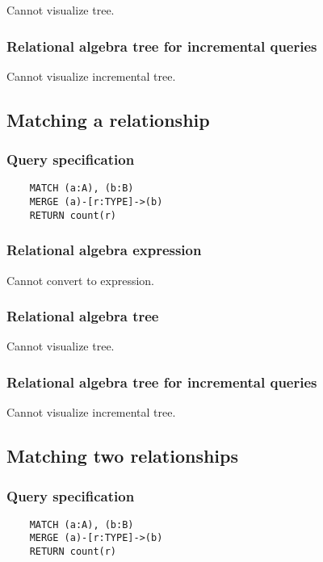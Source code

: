 	Cannot visualize tree.

	\subsubsection*{Relational algebra tree for incremental queries}

	Cannot visualize incremental tree.
	\subsection{Matching a relationship}

	\subsubsection*{Query specification}

	\begin{lstlisting}
	MATCH (a:A), (b:B)
	MERGE (a)-[r:TYPE]->(b)
	RETURN count(r)
	\end{lstlisting}


	\subsubsection*{Relational algebra expression}

	Cannot convert to expression.

	\subsubsection*{Relational algebra tree}

	Cannot visualize tree.

	\subsubsection*{Relational algebra tree for incremental queries}

	Cannot visualize incremental tree.
	\subsection{Matching two relationships}

	\subsubsection*{Query specification}

	\begin{lstlisting}
	MATCH (a:A), (b:B)
	MERGE (a)-[r:TYPE]->(b)
	RETURN count(r)
	\end{lstlisting}


